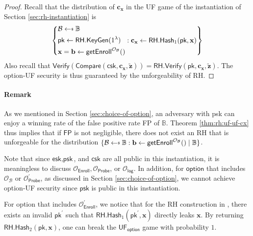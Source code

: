 \begin{proof}

Recall that the distribution of $\mathbf{c_x}$ in the \textsf{UF} game of the instantiation of Section \ref{sec:rh-instantiation} is
\[
	\left \{
		\begin{aligned} 
			 & \mathcal{B} \getsdollar \mathbb{B} \\
			 & \textsf{pk} \gets \textsf{RH.KeyGen}(1^\lambda) \\
			 & \mathbf{x} = \mathbf{b} \gets \textsf{getEnroll}^{\mathcal{O}_\mathcal{B}}() 
		\end{aligned} :
		\mathbf{c_x} \gets \textsf{RH.Hash}_1(\textsf{pk}, \mathbf{x})
	\right \}
\]
Also recall that $\textsf{Verify}(\textsf{Compare}(\textsf{csk}, \mathbf{c_x}, \mathbf{\tilde{z}} )) = \textsf{RH.Verify}(\textsf{pk}, \mathbf{c_x}, \mathbf{\tilde{z}} )$.
The \textsf{option}-UF security is thus guaranteed by the unforgeability of \textsf{RH}.

\end{proof}

\paragraph{Remark}
As we mentioned in Section \ref{sec:choice-of-option}, an adversary with \textsf{psk} can enjoy a winning rate of the false positive rate \textsf{FP} of $\mathbb{B}$. Theorem \ref{thm:rh:uf-uf-cx} thus implies that if $\textsf{FP}$ is not negligible, there does not exist an \textsf{RH} that is unforgeable for the distribution $\{ \mathcal{B} \getsdollar \mathbb{B}: \mathbf{b} \gets {\sf getEnroll}^{\mathcal{O}_\mathcal{B}}() \mid \mathbb{B} \}$.


Note that since $\textsf{esk}, \textsf{psk}$, and $ \textsf{csk}$ are all public in this instantiation, it is meaningless to discuss $\mathcal{O}_\textsf{Enroll}, \mathcal{O}_\textsf{Probe}$, or $\mathcal{O}_\textsf{log}$. In addition, for $\textsf{option}$ that includes $\mathcal{O}_\mathcal{B}$ or $\mathcal{O}_\textsf{Probe}^\prime$, as discussed in Section \ref{sec:choice-of-option}, we cannot achieve \textsf{option}-UF security since $\textsf{psk}$ is public in this instantiation.

For \textsf{option} that includes $\mathcal{O}_\textsf{Enroll}^\prime$, we notice that for the \textsf{RH} construction in \cite{cryptoeprint:2014/394}, there exists an invalid $\textsf{pk}^\prime$ such that $\textsf{RH.Hash}_1(\textsf{pk}^\prime, \mathbf{x})$ directly leaks $\mathbf{x}$. By returning $\textsf{RH.Hash}_2( \textsf{pk}, \mathbf{x} )$, one can break the $\textsf{UF}_{\textsf{option}}$ game with probability $1$.


